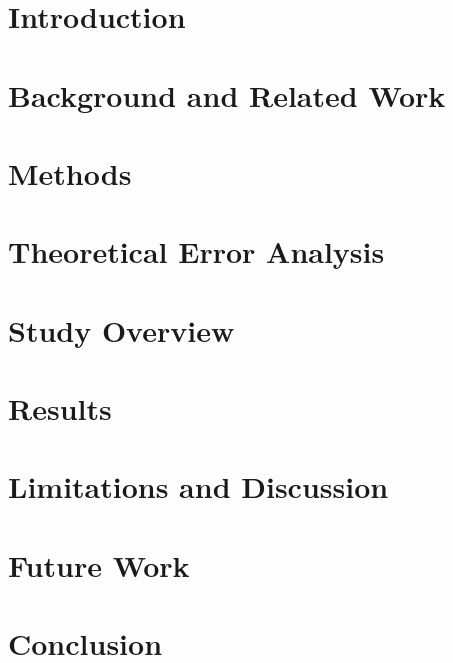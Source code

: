 
\section{Introduction}
\label{sec:introduction}


\section{Background and Related Work}
\label{sec:related}


\section{Methods}
\label{sec:method}

\section{Theoretical Error Analysis}
\label{sec:theory}


\section{Study Overview }
\label{sec:study}


\section{Results}
\label{sec:results}


%
\section{Limitations and Discussion}
\label{sec:limitations}


\section{Future Work}
\label{sec:futurework}


\section{Conclusion}
\label{sec:conclusion}

